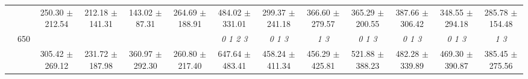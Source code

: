 \begin{table}[h]
{\begin{tabular}{
        ccccccccccccc}
 & & \cellcolor[HTML]{EFEFEF} 250.30 $\pm$ 212.54& \cellcolor[HTML]{EFEFEF} 212.18 $\pm$ 141.31& \cellcolor[HTML]{EFEFEF} 143.02 $\pm$ 87.31& \cellcolor[HTML]{EFEFEF} 264.69 $\pm$ 188.91& \cellcolor[HTML]{EFEFEF} 484.02 $\pm$ 331.01& \cellcolor[HTML]{EFEFEF} 299.37 $\pm$ 241.18& \cellcolor[HTML]{EFEFEF} 366.60 $\pm$ 279.57& \cellcolor[HTML]{EFEFEF} 365.29 $\pm$ 200.55& \cellcolor[HTML]{EFEFEF} 387.66 $\pm$ 306.42& \cellcolor[HTML]{EFEFEF} 348.55 $\pm$ 294.18& \cellcolor[HTML]{EFEFEF} 285.78 $\pm$ 154.48 \\ 
 & \multirow{2}{*}{650}& & & & & \textit{ 0 1 2 3 }& \textit{ 0 1 3 }& \textit{ 1 3 }& \textit{ 0 1 3 }& \textit{ 0 1 3 }& \textit{ 0 1 3 }& \textit{ 1 3 } \\ 
 & & 305.42 $\pm$ 269.12& 231.72 $\pm$ 187.98& 360.97 $\pm$ 292.30& 260.80 $\pm$ 217.40& 647.64 $\pm$ 483.41& 458.24 $\pm$ 411.34& 456.29 $\pm$ 425.81& 521.88 $\pm$ 388.23& 482.28 $\pm$ 339.89& 469.30 $\pm$ 390.87& 385.45 $\pm$ 275.56 \\ \midrule 

        \bottomrule
        \end{tabular}%
        }

        \end{table}
        
